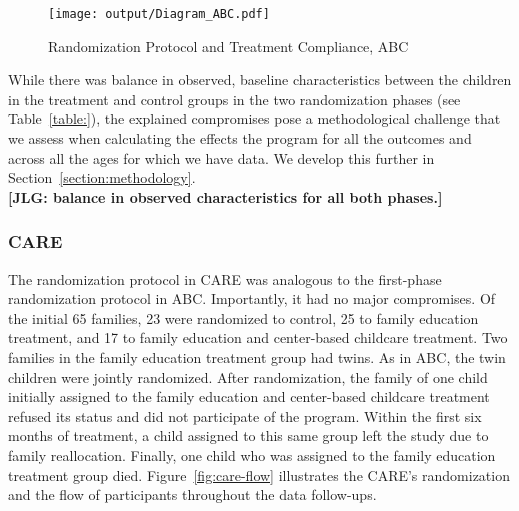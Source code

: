 \begin{center}
	\begin{figure}[H]
		\caption{Randomization Protocol and Treatment Compliance, ABC} \label{fig:abc-flow}
		\centering
		\texttt{[image: output/Diagram\_ABC.pdf]}
	\end{figure}
\end{center}

\noindent While there was balance in observed, baseline characteristics between the children in the treatment and control groups in the two randomization phases (see Table~\ref{table:}), the explained compromises pose a methodological challenge that we assess when calculating the effects the program for all the outcomes and across all the ages for which we have data. We develop this further in Section~\ref{section:methodology}.\\

\noindent \textbf{[JLG: balance in observed characteristics for all both phases.]}\\

\subsubsection{CARE}

\noindent The randomization protocol in CARE was analogous to the first-phase randomization protocol in ABC. Importantly, it had no major compromises. Of the initial 65 families, 23 were randomized to control, 25 to family education treatment, and 17 to family education and center-based childcare treatment. Two families in the family education treatment group had twins. As in ABC, the twin children were jointly randomized. After randomization, the family of one child initially assigned to the family education and center-based childcare treatment refused its status and did not participate of the program. Within the first six months of treatment, a child assigned to this same group left the study due to family reallocation. Finally, one child who was assigned to the family education treatment group died. Figure~\ref{fig:care-flow} illustrates the CARE's randomization and the flow of participants throughout the data follow-ups.\\

